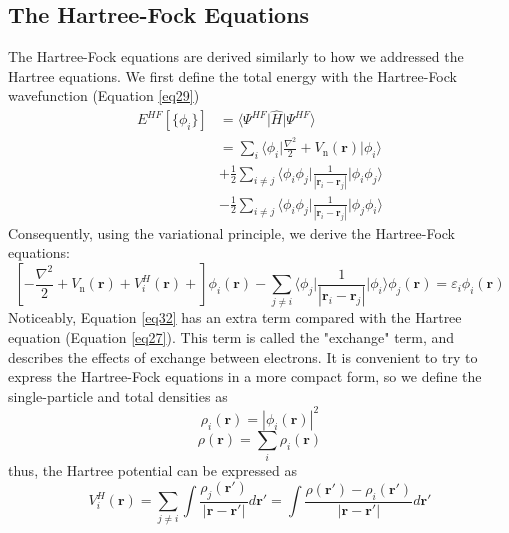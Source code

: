 \subsection{The Hartree-Fock Equations}
The Hartree-Fock equations are derived similarly to how we addressed the Hartree equations. We first define the total energy with the Hartree-Fock wavefunction (Equation \ref{eq29}) 
\begin{equation}
  \label{eq31}
  \begin{split}
    E^{HF}[\{\phi_i\}] &= \bigg\langle \Psi^{HF} \bigg| \hat{H} \bigg| \Psi^{HF} \bigg\rangle\\
    &= \sum_{i} \langle \phi_i \big|\frac{\nabla^2}{2} + V_{\text{n}}(\mathbf{r})\big| \phi_i \rangle\\
    &+ \frac{1}{2} \sum_{i\neq j} \langle \phi_i \phi_j \big| \frac{1}{|\mathbf{r}_i - \mathbf{r}_j|} \big| \phi_i \phi_j\rangle\\
    &- \frac{1}{2} \sum_{i\neq j} \langle \phi_i \phi_j \big| \frac{1}{|\mathbf{r}_i - \mathbf{r}_j|} \big| \phi_j \phi_i\rangle
  \end{split}
\end{equation}
Consequently, using the variational principle, we derive the Hartree-Fock equations: 
\begin{equation}
  \label{eq32}
  \left[-\frac{\nabla^2}{2} + V_{\text{n}}(\mathbf{r}) + V^H_i(\mathbf{r}) +\right]\phi_i(\mathbf{r})
  - \sum_{j\neq i} \langle \phi_j \big| \frac{1}{|\mathbf{r}_i - \mathbf{r}_j|} \big| \phi_i \rangle \phi_j(\mathbf{r})
  = \varepsilon_i \phi_i(\mathbf{r})
\end{equation}
Noticeably, Equation \ref{eq32} has an extra term compared with the Hartree equation (Equation \ref{eq27}). This term is called the "exchange" term\supercite{kaxiras2003atomic}, and describes the effects of exchange between electrons. It is convenient to try to express the Hartree-Fock equations in a more compact form, so we define the single-particle and total densities as 
\begin{equation}
  \label{eq33}
  \rho_i(\mathbf{r}) = |\phi_i(\mathbf{r})|^2
\end{equation}
\begin{equation}
  \label{eq34}
  \rho(\mathbf{r}) = \sum_i \rho_i(\mathbf{r}) 
\end{equation}
thus, the Hartree potential can be expressed as 
\begin{equation}
  \label{eq35}
  V^H_i(\mathbf{r}) = \sum_{j\neq i}  \int \frac{\rho_j(\mathbf{r'})}{|\mathbf{r} - \mathbf{r'}|} d\mathbf{r'} 
  = \int \frac{\rho(\mathbf{r'}) - \rho_i(\mathbf{r'})}{|\mathbf{r} - \mathbf{r'}|} d\mathbf{r'}
\end{equation}
